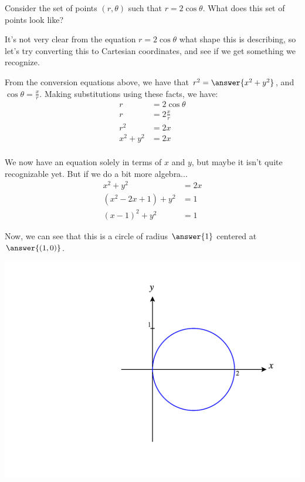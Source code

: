\documentclass{ximera}
\begin{document}
\begin{example}
Consider the set of points $(r,\theta)$ such that $r = 2\cos\theta$. What does this set of points look like?

It's not very clear from the equation $r=2\cos\theta$ what shape this is describing, so let's try converting this to Cartesian coordinates, and see if we get something we recognize.

From the conversion equations above, we have that $r^2 = \answer{x^2+y^2}$, and $\cos\theta = \frac{x}{r}$. Making substitutions using these facts, we have:
\begin{align*}
r &= 2\cos\theta\\
r &= 2\frac{x}{r}\\
r^2 &= 2x\\
x^2+y^2 &= 2x\\
\end{align*}

We now have an equation solely in terms of $x$ and $y$, but maybe it isn't quite recognizable yet. But if we do a bit more algebra...
\begin{align*}
x^2 + y^2 &= 2x\\
(x^2-2x+1) + y^2 &= 1\\
(x-1)^2 + y^2 &=1
\end{align*}

Now, we can see that this is a circle of radius $\answer{1}$ centered at $\answer{(1,0)}$.

\begin{image}
\includegraphics[width=\textwidth]{CalcPlot3D-circle_10}
\end{image}

\end{example}
\end{document}
